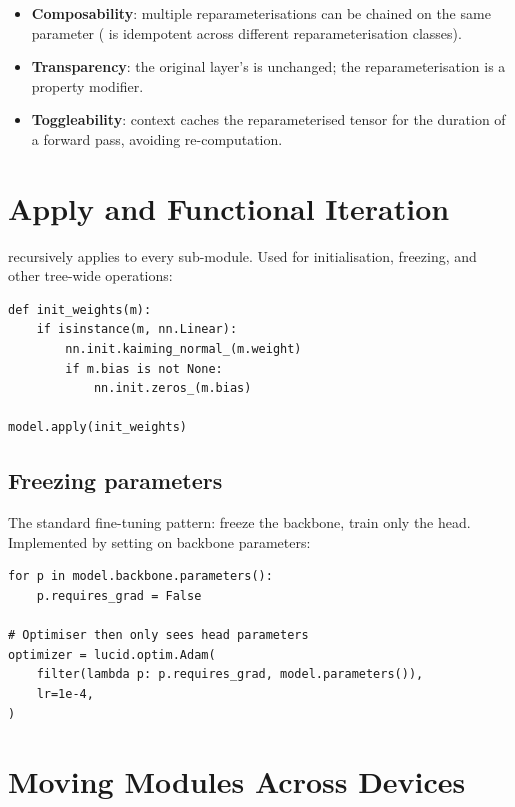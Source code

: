 \begin{itemize}
  \item \textbf{Composability}: multiple reparameterisations
    can be chained on the same parameter
    ( is idempotent across
    different reparameterisation classes).
  \item \textbf{Transparency}: the original layer's
     is unchanged; the
    reparameterisation is a property modifier.
  \item \textbf{Toggleability}:  context
    caches the reparameterised tensor for the duration of a
    forward pass, avoiding re-computation.
\end{itemize}

\section{Apply and Functional Iteration}
\label{sec:module_system:apply}

 recursively applies  to every
sub-module. Used for initialisation, freezing, and other
tree-wide operations:

\begin{lstlisting}[style=lucid,language=LucidPython]
def init_weights(m):
    if isinstance(m, nn.Linear):
        nn.init.kaiming_normal_(m.weight)
        if m.bias is not None:
            nn.init.zeros_(m.bias)

model.apply(init_weights)
\end{lstlisting}

\subsection{Freezing parameters}
\label{ssec:module_system:freezing}

The standard fine-tuning pattern: freeze the backbone, train only
the head. Implemented by setting  on
backbone parameters:

\begin{lstlisting}[style=lucid,language=LucidPython]
for p in model.backbone.parameters():
    p.requires_grad = False

# Optimiser then only sees head parameters
optimizer = lucid.optim.Adam(
    filter(lambda p: p.requires_grad, model.parameters()),
    lr=1e-4,
)
\end{lstlisting}

\section{Moving Modules Across Devices}
\label{sec:module_system:device_move}

